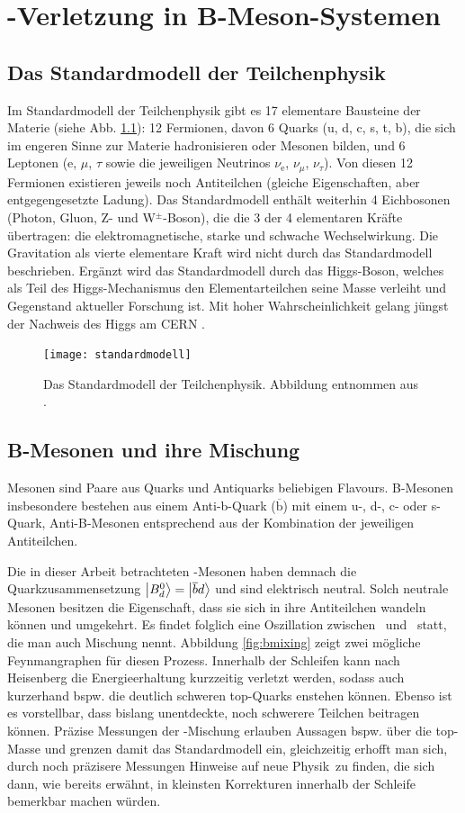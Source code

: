 \chapter{\CP-Verletzung in B-Meson-Systemen} \label{kap:cp-verletzung}
\section{Das Standardmodell der Teilchenphysik}
Im Standardmodell der Teilchenphysik gibt es 17 elementare Bausteine der Materie (siehe Abb. \ref{fig:standardmodell}): 12 Fermionen, davon 6 Quarks (u, d, c, s, t, b), die sich im engeren Sinne zur Materie hadronisieren oder Mesonen bilden, und 6 Leptonen (e, $\mu$, $\tau$ sowie die jeweiligen Neutrinos $\nu_{\text{e}}$, $\nu_{\mu}$, $\nu_{\tau}$). Von diesen 12 Fermionen existieren jeweils noch Antiteilchen (gleiche Eigenschaften, aber entgegengesetzte Ladung). Das Standardmodell enthält weiterhin 4 Eichbosonen (Photon, Gluon, Z- und W$^{\pm}$-Boson), die die 3 der 4 elementaren Kräfte übertragen: die elektromagnetische, starke und schwache Wechselwirkung. Die Gravitation als vierte elementare Kraft wird nicht durch das Standardmodell beschrieben. Ergänzt wird das Standardmodell durch das Higgs-Boson, welches als Teil des Higgs-Mechanismus den Elementarteilchen seine Masse verleiht und Gegenstand aktueller Forschung ist. Mit hoher Wahrscheinlichkeit gelang jüngst der Nachweis des Higgs am CERN \cite{higgs}.
\begin{figure}[hptb]
\centering
\texttt{[image: standardmodell]}
\caption{Das Standardmodell der Teilchenphysik. Abbildung entnommen aus \cite{wiki_standard}.}
\label{fig:standardmodell}
\end{figure}

\section{B-Mesonen und ihre Mischung}
Mesonen sind Paare aus Quarks und Antiquarks beliebigen Flavours. B-Mesonen insbesondere bestehen aus einem Anti-b-Quark ($\mathrm{\overline{b}}$) mit einem u-, d-, c- oder s-Quark, Anti-B-Mesonen entsprechend aus der Kombination der jeweiligen Antiteilchen.

Die in dieser Arbeit betrachteten \Bd-Mesonen haben demnach die Quarkzusammensetzung $\Ket{\text{$B_d^0$}} = \Ket{\overline{b}d}$ und sind elektrisch neutral. Solch neutrale Mesonen besitzen die Eigenschaft, dass sie sich in ihre Antiteilchen wandeln können und umgekehrt. Es findet folglich eine Oszillation zwischen \Bd\ und \Bdbar\ statt, die man auch Mischung nennt. Abbildung \ref{fig:bmixing} zeigt zwei mögliche Feynmangraphen für diesen Prozess. Innerhalb der Schleifen kann nach Heisenberg die Energieerhaltung kurzzeitig verletzt werden, sodass auch kurzerhand bspw. die deutlich schweren top-Quarks enstehen können. Ebenso ist es vorstellbar, dass bislang unentdeckte, noch schwerere Teilchen beitragen können. Präzise Messungen der \Bd-Mischung erlauben Aussagen bspw. über die top-Masse und grenzen damit das Standardmodell ein, gleichzeitig erhofft man sich, durch noch präzisere Messungen Hinweise auf \glqq neue Physik\grqq\ zu finden, die sich dann, wie bereits erwähnt, in kleinsten Korrekturen innerhalb der Schleife bemerkbar machen würden.

